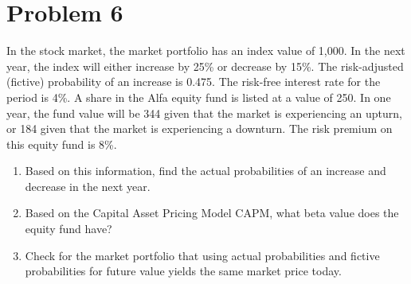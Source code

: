 \documentclass[12]{article}
\begin{document}
\section*{Problem 6}
In the stock market, the market portfolio has an index value of 1,000. In the next year, the index will either increase by 25\% or decrease by 15\%. The risk-adjusted (fictive) probability of an increase is 0.475. The risk-free interest rate for the period is 4\%. A share in the Alfa equity fund is listed at a value of 250. In one year, the fund value will be 344 given that the market is experiencing an upturn, or 184 given that the market is experiencing a downturn. The risk premium on this equity fund is 8\%.
\begin{enumerate}
    \item[a.]  Based on this information, find the actual probabilities of an increase and decrease in the next year.
    \item[b.]  Based on the Capital Asset Pricing Model CAPM, what beta value does the equity fund have?
    \item[c.]  Check for the market portfolio that using actual probabilities and fictive probabilities for future value yields the same market price today.
\end{enumerate}


\color{blue}
\end{document}
